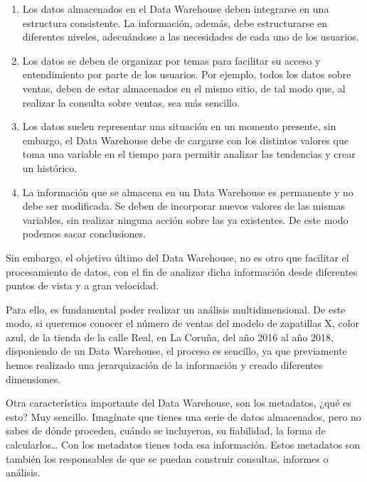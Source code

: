 \documentclass{article} %
\begin{document}
\begin{enumerate}
\item \textbf{ }Los datos almacenados en el Data Warehouse deben integrarse en una estructura consistente. La informaci\'{o}n, adem\'{a}s, debe estructurarse en diferentes niveles, adecu\'{a}ndose a las necesidades de cada uno de los usuarios.

\item  Los datos se deben de organizar por temas para facilitar su acceso y entendimiento por parte de los usuarios. Por ejemplo, todos los datos sobre ventas, deben de estar almacenados en el mismo sitio, de tal modo que, al realizar la consulta sobre ventas, sea m\'{a}s sencillo.

\item  Los datos suelen representar una situaci\'{o}n en un momento presente, sin embargo, el Data Warehouse debe de cargarse con los distintos valores que toma una variable en el tiempo para permitir analizar las tendencias y crear un hist\'{o}rico.

\item  La informaci\'{o}n que se almacena en un Data Warehouse es permanente y no debe ser modificada. Se deben de incorporar nuevos valores de las mismas variables, sin realizar ninguna acci\'{o}n sobre las ya existentes. De este modo podemos sacar conclusiones.
\end{enumerate}

\noindent 

\noindent Sin embargo, el objetivo \'{u}ltimo del Data Warehouse, no es otro que facilitar el procesamiento de datos, con el fin de analizar dicha informaci\'{o}n desde diferentes puntos de vista y a gran velocidad.

\noindent 

\noindent Para ello, es fundamental poder realizar un an\'{a}lisis multidimensional. De este modo, si queremos conocer el n\'{u}mero de ventas del modelo de zapatillas X, color azul, de la tienda de la calle Real, en La Coru\~{n}a, del a\~{n}o 2016 al a\~{n}o 2018, disponiendo de un Data Warehouse, el proceso es sencillo, ya que previamente hemos realizado una jerarquizaci\'{o}n de la informaci\'{o}n y creado diferentes dimensiones.

\noindent 

\noindent Otra caracter\'{i}stica importante del Data Warehouse, son los metadatos, ¿qu\'{e} es esto? Muy sencillo. Imag\'{i}nate que tienes una serie de datos almacenados, pero no sabes de d\'{o}nde proceden, cu\'{a}ndo se incluyeron, su fiabilidad, la forma de calcularlos{\dots} Con los metadatos tienes toda esa informaci\'{o}n. Estos metadatos son tambi\'{e}n los responsables de que se puedan construir consultas, informes o an\'{a}lisis.
\end{document}
